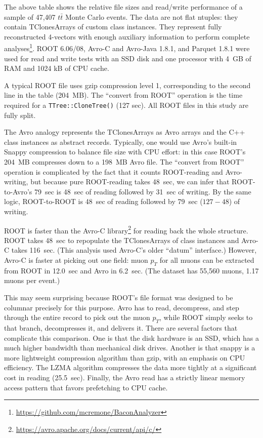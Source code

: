 \documentclass{article}
\begin{document}
\vspace{0.3 cm}
The above table shows the relative file sizes and read/write performance of a sample of 47,407 $t\bar{t}$ Monte Carlo events. The data are not flat ntuples: they contain TClonesArrays of custom class instances. They represent fully reconstructed 4-vectors with enough auxiliary information to perform complete analyses\footnote{\url{https://github.com/mcremone/BaconAnalyzer}}. ROOT 6.06/08, Avro-C and Avro-Java 1.8.1, and Parquet 1.8.1 were used for read and write tests with an SSD disk and one processor with 4~GB of RAM and 1024 kB of CPU cache.

A typical ROOT file uses gzip compression level 1, corresponding to the second line in the table (204~MB). The ``convert from ROOT'' operation is the time required for a {\tt TTree::CloneTree()} (127 sec). All ROOT files in this study are fully split.

The Avro analogy represents the TClonesArrays as Avro arrays and the C++ class instances as abstract records. Typically, one would use Avro's built-in Snappy compression to balance file size with CPU effort: in this case ROOT's 204~MB compresses down to a 198~MB Avro file. The ``convert from ROOT'' operation is complicated by the fact that it counts ROOT-reading and Avro-writing, but because pure ROOT-reading takes 48~sec, we can infer that ROOT-to-Avro's 79~sec is 48~sec of reading followed by 31~sec of writing. By the same logic, ROOT-to-ROOT is 48~sec of reading followed by 79~sec ($127 - 48$) of writing.

ROOT is faster than the Avro-C library\footnote{\url{https://avro.apache.org/docs/current/api/c/}} for reading back the whole structure. ROOT takes 48~sec to repopulate the TClonesArrays of class instances and Avro-C takes 116~sec. (This analysis used Avro-C's older ``datum'' interface.) However, Avro-C is faster at picking out one field: muon $p_T$ for all muons can be extracted from ROOT in 12.0~sec and Avro in 6.2~sec. (The dataset has 55,560 muons, 1.17 muons per event.)

This may seem surprising because ROOT's file format was designed to be columnar precisely for this purpose. Avro has to read, decompress, and step through the entire record to pick out the muon $p_T$, while ROOT simply seeks to that branch, decompresses it, and delivers it. There are several factors that complicate this comparison. One is that the disk hardware is an SSD, which has a much higher bandwidth than mechanical disk drives. Another is that snappy is a more lightweight compression algorithm than gzip, with an emphasis on CPU efficiency. The LZMA algorithm compresses the data more tightly at a significant cost in reading (25.5~sec). Finally, the Avro read has a strictly linear memory access pattern that favors prefetching to CPU cache.
\end{document}

